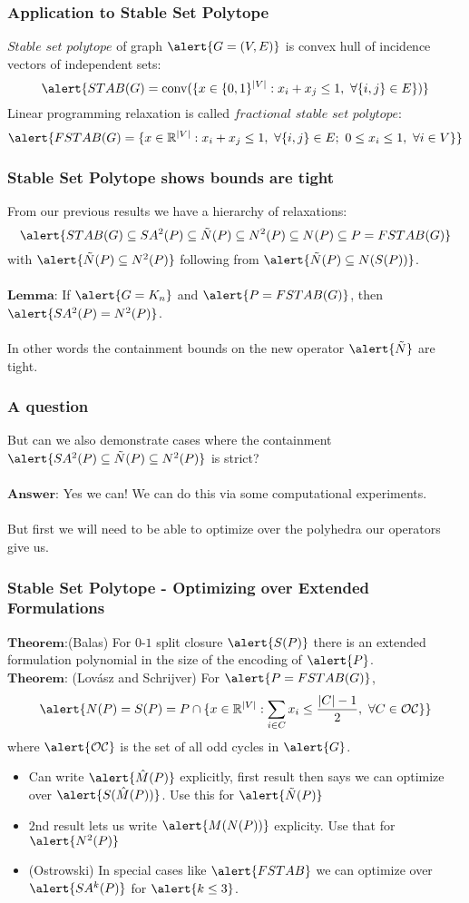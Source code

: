 \documentclass{beamer}
\DeclareMathOperator{\conv}{conv}
\begin{document}
\begin{frame}
\frametitle{Application to Stable Set Polytope}
$\textit{Stable set polytope}$ of graph $\alert{G = (V,E)}$ is convex hull of incidence vectors of independent sets:
$$\alert{STAB(G) = \conv(\{x \in \{0,1\}^{|V|} : x_i + x_j \leq 1,\ \forall \{i,j\} \in E\})}$$
Linear programming relaxation is called $\textit{fractional stable set polytope}$:
$$\alert{FSTAB(G) = \{x \in \R^{|V|} : x_i + x_j \leq 1,\ \forall \{i,j\} \in E;\ 0 \leq x_i \leq 1,\ \forall i \in V\}}$$
\end{frame}

\begin{frame}
\frametitle{Stable Set Polytope shows bounds are tight}
From our previous results we have a hierarchy of relaxations:
$$\alert{STAB(G) \subseteq SA^2(P) \subseteq \tilde{N}(P) \subseteq N^2(P) \subseteq N(P) \subseteq P = FSTAB(G)}$$
with $\alert{\tilde{N}(P) \subseteq N^2(P)}$ following from $\alert{\tilde{N}(P) \subseteq N(S(P))}$.\\
\ \\
$\textbf{Lemma:}$ If $\alert{G = K_n}$ and $\alert{P = FSTAB(G)}$, then $\alert{SA^2(P) = N^2(P)}$.\\
\ \\
In other words the containment bounds on the new operator $\alert{\tilde{N}}$ are tight.
\end{frame}

\begin{frame}
\frametitle{A question}
But can we also demonstrate cases where the containment $\alert{SA^2(P) \subseteq \tilde{N}(P) \subseteq N^2(P)}$ is strict?\\\ \\
$\textbf{Answer:}$ Yes we can! We can do this via some computational experiments.\\\ \\
But first we will need to be able to optimize over the polyhedra our operators give us.
\end{frame}

\begin{frame}
\frametitle{Stable Set Polytope - Optimizing over Extended Formulations}
$\textbf{Theorem:}$(Balas) For $0$-$1$ split closure $\alert{S(P)}$ there is an extended formulation polynomial in the size of the encoding of $\alert{P}$.\\
$\textbf{Theorem:}$ (Lov\'asz and Schrijver) For $\alert{P = FSTAB(G)}$, $$\alert{N(P) = S(P) = P \cap \{x \in \R^{|V|} : \sum_{i \in C} x_i \leq \frac{|C|-1}{2},\ \forall C \in \mathcal{O}\mathcal{C}\}}$$
where $\alert{\mathcal{O}\mathcal{C}}$ is the set of all odd cycles in $\alert{G}$.
\begin{itemize}
\item Can write $\alert{\hat{M}(P)}$ explicitly, first result then says we can optimize over $\alert{S(\hat{M}(P))}$. Use this for $\alert{\tilde{N}(P)}$
\item $2$nd result lets us write $\alert{M(N(P))}$ explicity. Use that for $\alert{N^2(P)}$
\item (Ostrowski) In special cases like $\alert{FSTAB}$ we can optimize over $\alert{SA^k(P)}$ for $\alert{k\leq 3}$.
\end{itemize}
\end{frame}
\end{document}
